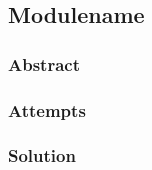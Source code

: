 \subsection{Modulename}
\def\kapitelautor{}

\subsubsection{Abstract}

\subsubsection{Attempts}

\subsubsection{Solution} %
